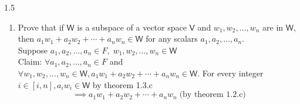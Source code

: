 \documentclass[letterpaper,12pt]{article}
\newcommand{\?}{\stackrel{?}{=}}
\begin{document}
\begin{spacing}{1.5}
\begin{enumerate}
\begin{enumerate}[(a)]
\\
Claim: $\left(ca_1,ca_2,\dots,ca_n\right) \in \mathsf{W}_2$
\begin{equation}
c\left(a_1,a_2,\dots,a_n\right) = \left(ca_1,ca_2,\dots,ca_n\right)
\end{equation}
\begin{equation}
\sum\limits_{k=1}^n \left(ca_k\right) = c\sum\limits_{k=1}^n
\left(a_k\right) = 0
\end{equation}
\begin{equation}
\therefore \left(ca_1,ca_2,\dots,ca_n+\right) \in \mathsf{W}_1
\end{equation}
\end{enumerate}
\newpage{}
Suppose
$\left(a_1,a_2,\dots,a_n\right),\left(b_1,b_2,\dots,b_n\right) \in \mathsf{W}_2$
\\
Claim: $\left(a_1+b_1,a_1+b_2,\dots,a_n+b_n\right) \notin
\mathsf{W}_2\right)$
\begin{equation}
\left(a_1,a_2,\dots,a_n\right + \left(b_1,b_2,\dots,b_n\right) = \left(a_1+b_1,a_2+b_2,\dots,a_n+b_n\right)
\end{equation}
\begin{equation}
\sum\limits_{k=1}^n\left(a_k\right) +
\sum\limits_{k=1}^n\left(b_k\right) = \sum\limits_{k=1}^n\left(a_k +
  b_k\right) = 2
\end{equation}
\begin{equation}
\therefore \left(a_1+b_1,a_2+b_2,\dots,a_n+b_n\right) \notin \mathsf{W}_2
\end{equation}
\setcounter{enumi}{19}
\item Prove that if $\mathsf{W}$ is a subspace of a vector space $\mathsf{V}$ and
  $w_1, w_2,\dots,w_n$ are in $\mathsf{W}$, then $a_1w_1 + a_2w_2 +
  \cdots + a_nw_n \in \mathsf{W}$ for any scalars $a_1,a_2,\dots,a_n$.
\\
Suppose $a_1,a_2,\dots,a_n \in F,\; w_1,w_2,\dots,w_n \in \mathsf{W}$
\\
Claim: $\forall a_1,a_2,\dots,a_n \in F$ and $\forall
w_1,w_2,\dots,w_n \in \mathsf{W}, a_1w_1 + a_2w_2+\cdots+a_nw_n\in
\mathsf{W}$.
For every integer $i \in \left[i,n\right], a_iw_i \in \mathsf{W}$ by
theorem 1.3.c
\begin{equation}
\implies a_1w_1 + a_2w_2 +\cdots+a_nw_n\; \text{(by theorem 1.2.c)}
\end{equation}


\end{enumerate}
\end{spacing}
\end{document}
